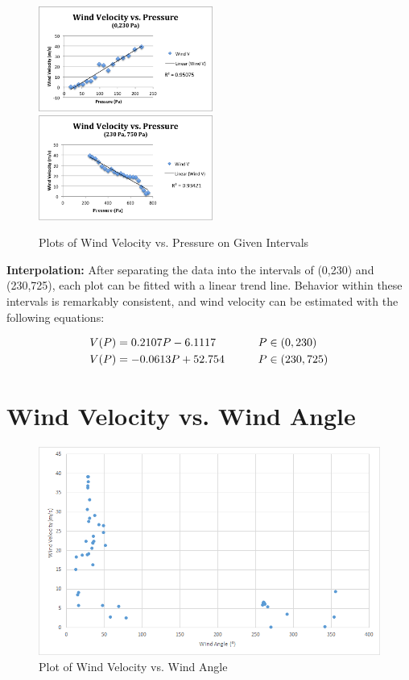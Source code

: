 \documentclass{journal}
\begin{document}
\begin{figure}[H]
\centering
\includegraphics[width=2.25in]{LPANDA.png}\hfill \includegraphics[width=2.25in]{RPANDA.png}
\caption{Plots of Wind Velocity vs. Pressure on Given Intervals}
\end{figure}

\begin{flushleft}
\textbf{Interpolation:} After separating the data into the intervals of (0,230) and (230,725), each plot can be fitted with a linear trend line.  Behavior within these intervals is remarkably consistent, and wind velocity can be estimated with the following equations:
\end{flushleft}

\begin{align*}
\centering
    V(P) &= 0.2107P - 6.1117&& \text{\qquad $P\in(0,230)$} \\
    V(P) &= -0.0613P + 52.754 && \text{\qquad $P\in(230,725)$} \\
\end{align*}


\part{Wind Velocity vs. Wind Angle}
\begin{figure}[H]
  \centering
  \includegraphics[width=\textwidth]{alan-data.png}
  \caption{Plot of Wind Velocity vs. Wind Angle}
\end{figure}
\end{document}
